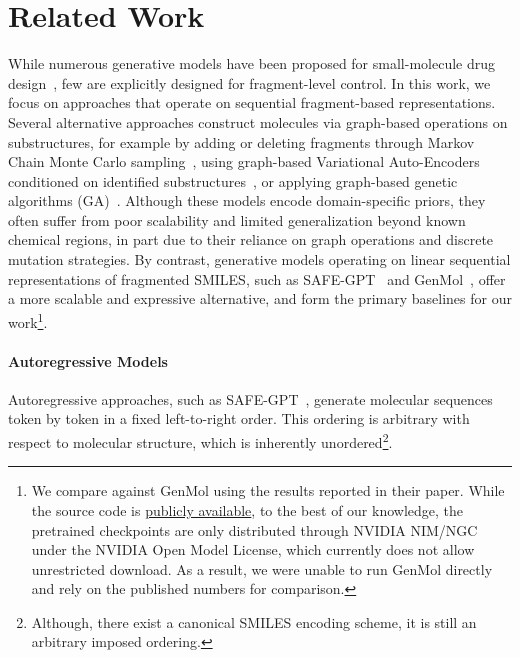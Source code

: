 \documentclass{article} %
\begin{document}
\section{Related Work}
While numerous generative models have been proposed for small-molecule drug design~\citep{graphga, olivecrona2017molecular, morrison2024gfngraphfeedforwardnetwork, gao2022amortizedtreegenerationbottomup, nigam2020augmentinggeneticalgorithmsdeep, bou2024acegenreinforcementlearninggenerative}, few are explicitly designed for fragment-level control. In this work, we focus on approaches that operate on sequential fragment-based representations. Several alternative approaches construct molecules via graph-based operations on substructures, for example by adding or deleting fragments through Markov Chain Monte Carlo sampling~\citep{xie2021marsmarkovmolecularsampling}, using graph-based Variational Auto-Encoders conditioned on identified substructures~\citep{pmlr-v119-jin20b, jin2018junction,maziarz2024learningextendmolecularscaffolds}, or applying graph-based genetic algorithms (GA)~\citep{graphga, tripp2023geneticalgorithmsstrongbaselines}. Although these models encode domain-specific priors, they often suffer from poor scalability and limited generalization beyond known chemical regions, in part due to their reliance on graph operations and discrete mutation strategies.
By contrast, generative models operating on linear sequential representations of fragmented SMILES, such as SAFE-GPT~\citep{noutahi2023gottasafenewframework} and GenMol~\citep{genmol}, offer a more scalable and expressive alternative, and form the primary baselines for our work\footnote{We compare against GenMol using the results reported in their paper. While the source code is \href{https://github.com/NVIDIA-Digital-Bio/genmol}{publicly available}, to the best of our knowledge, the pretrained checkpoints are only distributed through NVIDIA NIM/NGC under the NVIDIA Open Model License, which currently does not allow unrestricted download. As a result, we were unable to run GenMol directly and rely on the published numbers for comparison.}.
\paragraph{Autoregressive Models}
Autoregressive approaches, such as SAFE-GPT~\citep{noutahi2023gottasafenewframework}, generate molecular sequences token by token in a fixed left-to-right order. This ordering is arbitrary with respect to molecular structure, which is inherently unordered\footnote{Although, there exist a canonical SMILES encoding scheme, it is still an arbitrary imposed ordering.}.
\end{document}
